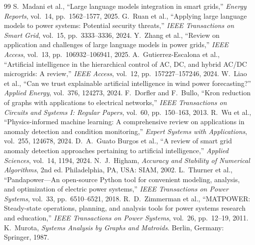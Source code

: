 \documentclass[final,5p,times,twocolumn]{elsarticle}
\begin{document}
\begin{thebibliography}{99}
 S.~Madani et al., ``Large language
models integration in smart grids,'' \emph{Energy Reports}, vol.~14,
pp.~1562--1577, 2025.
 G.~Ruan et al., ``Applying large
language models to power systems: Potential security threats,'' \emph{IEEE
Transactions on Smart Grid}, vol.~15, pp.~3333--3336, 2024.
 Y.~Zhang et al., ``Review on application
and challenges of large language models in power grids,'' \emph{IEEE Access},
vol.~13, pp.~106932--106941, 2025.
 A.~Gutierrez-Escalona et al.,
``Artificial intelligence in the hierarchical control of AC, DC, and hybrid
AC/DC microgrids: A review,'' \emph{IEEE Access}, vol.~12,
pp.~157227--157246, 2024.
 W.~Liao et al., ``Can we trust explainable artificial
intelligence in wind power forecasting?'' \emph{Applied Energy}, vol.~376,
124273, 2024.
 F.~Dorfler and F.~Bullo, ``Kron reduction of graphs
with applications to electrical networks,'' \emph{IEEE Transactions on Circuits
and Systems I: Regular Papers}, vol.~60, pp.~150--163, 2013.
 R.~Wu et al., ``Physics-informed machine
learning: A comprehensive review on applications in anomaly detection and
condition monitoring,'' \emph{Expert Systems with Applications}, vol.~255,
124678, 2024.
 D.~A.~Guato Burgos et al., ``A review
of smart grid anomaly detection approaches pertaining to artificial
intelligence,'' \emph{Applied Sciences}, vol.~14, 1194, 2024.
 N.~J.~Higham, \emph{Accuracy and Stability of
Numerical Algorithms}, 2nd ed. Philadelphia, PA, USA: SIAM, 2002.
 L.~Thurner et al., ``Pandapower---An open-source
Python tool for convenient modeling, analysis, and optimization of electric
power systems,'' \emph{IEEE Transactions on Power Systems}, vol.~33,
pp.~6510--6521, 2018.
 R.~D.~Zimmerman et al., ``MATPOWER: Steady-state
operations, planning, and analysis tools for power systems research and
education,'' \emph{IEEE Transactions on Power Systems}, vol.~26, pp.~12--19,
2011.
 K.~Murota, \emph{Systems Analysis by Graphs and
Matroids}. Berlin, Germany: Springer, 1987.
\end{thebibliography}
\end{document}
